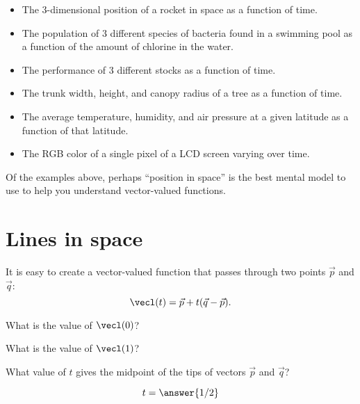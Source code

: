 \documentclass{ximera}
\begin{document}
\begin{itemize}
\item The $3$-dimensional position of a rocket in space as a function
  of time.
\item The population of $3$ different species of bacteria found in a
  swimming pool as a function of the amount of chlorine in the
  water.
\item The performance of $3$ different stocks as a function of time.
\item The trunk width, height, and canopy radius of a tree as a function of time.
\item The average temperature, humidity, and air pressure at a given latitude as a function of that latitude.
\item The RGB color of a single pixel of a LCD screen varying over time. 
\end{itemize}

Of the examples above, perhaps ``position in space'' is the best
mental model to use to help you understand vector-valued functions.

\section{Lines in space}

It is easy to create a vector-valued function that passes through two
points $\vec{p}$ and $\vec{q}$:
\[
\vecl(t) = \vec{p} + t(\vec{q}-\vec{p}).
\]
\begin{question}
  What is the value of $\vecl(0)$?
  \begin{prompt}
  \begin{multipleChoice}
  \end{multipleChoice}
  \end{prompt}
  \begin{question}
    What is the value of $\vecl(1)$?
    \begin{prompt}
    \begin{multipleChoice}
    \end{multipleChoice}
    \end{prompt}
    \begin{question}
      What value of $t$ gives the midpoint of the tips of vectors $\vec{p}$ and $\vec{q}$?
      \begin{prompt}
        \[
        t = \answer{1/2}
        \]
      \end{prompt}
    \end{question}
  \end{question}
\end{question}
\end{document}
